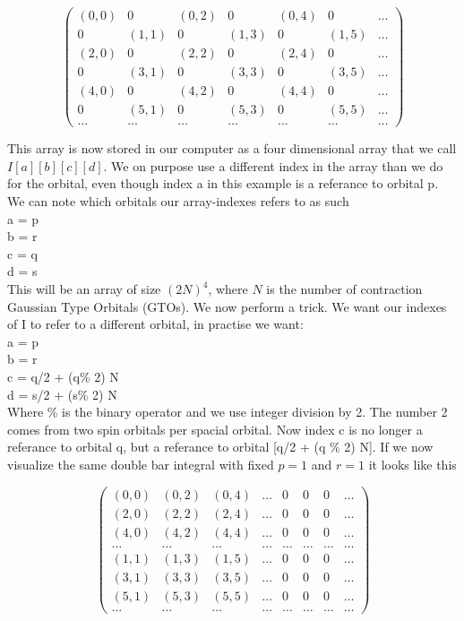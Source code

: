 \[ \left( \begin{array}{ccccccc}
(0,0) & 0 & (0,2) & 0 & (0,4) & 0 & \dots \\
0 & (1,1) & 0 & (1,3) & 0 & (1,5) & \dots \\
(2,0) & 0 & (2,2) & 0 & (2,4) & 0 & \dots \\
0 & (3,1) & 0 & (3,3) & 0 & (3,5) & \dots \\
(4,0) & 0 & (4,2) & 0 & (4,4) & 0 & \dots \\
0 & (5,1) & 0 & (5,3) & 0 & (5,5) & \dots \\
\dots & \dots & \dots & \dots & \dots & \dots & \dots \end{array} \right)\]

This array is now stored in our computer as a four dimensional array that we call $I[a][b][c][d]$. We on purpose use a different index in the array than we do for the orbital, even though index a in this example is a referance to orbital p. We can note which orbitals our array-indexes refers to as such\\
a = p \\
b = r \\
c = q \\
d = s \\

This will be an array of size $(2N)^4$, where $N$ is the number of contraction Gaussian Type Orbitals (GTOs). We now perform a trick. We want our indexes of I to refer to a different orbital, in practise we want:\\
a = p\\
b = r\\
c = q/2 + (q\% 2) N\\
d = s/2 + (s\% 2) N\\

Where \% is the binary operator and we use integer division by 2. The number 2 comes from two spin orbitals per spacial orbital. Now index c is no longer a referance to orbital q, but a referance to orbital [q/2 + (q \% 2) N]. If we now visualize the same double bar integral with fixed $p=1$ and $r=1$ it looks like this

\[ \left( \begin{array}{cccccccc}
(0,0) & (0,2) & (0,4) & \dots & 0 & 0 & 0 & \dots \\
(2,0) & (2,2) & (2,4) & \dots & 0 & 0 & 0 & \dots\\
(4,0) & (4,2) & (4,4) & \dots & 0 & 0 & 0 & \dots\\
\dots & \dots & \dots & \dots & \dots & \dots & \dots & \dots\\
(1,1) & (1,3) & (1,5) & \dots & 0 & 0 & 0 & \dots\\
(3,1) & (3,3) & (3,5) & \dots & 0 & 0 & 0 & \dots\\
(5,1) & (5,3) & (5,5) & \dots & 0 & 0 & 0 & \dots\\
\dots & \dots & \dots & \dots & \dots & \dots & \dots & \dots \end{array} \right)\]

